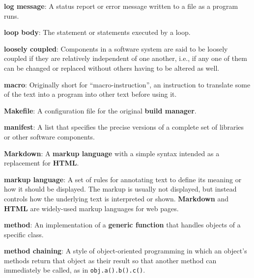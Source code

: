 \documentclass[krantzl]{krantz}
\newcommand{\glosskey}[1]{\textbf{#1}}
\begin{document}
\noindent \textbf{{\newline}\glosskey{log message}}: 
A status report or error message written to a file as a program runs.


\noindent \textbf{{\newline}\glosskey{loop body}}: 
The statement or statements executed by a loop.


\noindent \textbf{{\newline}\glosskey{loosely coupled}}: 
Components in a software system are said to be loosely coupled if they are relatively independent of one another, i.e., if any one of them can be changed or replaced without others having to be altered as well.


\noindent \textbf{{\newline}\glosskey{macro}}: 
Originally short for “macro-instruction”, an instruction to translate some of the text into a program into other text before using it.


\noindent \textbf{{\newline}\glosskey{Makefile}}: 
A configuration file for the original \glosskey{build manager}.


\noindent \textbf{{\newline}\glosskey{manifest}}: 
A list that specifies the precise versions of a complete set of libraries or other software components.


\noindent \textbf{{\newline}\glosskey{Markdown}}: 
A \glosskey{markup language} with a simple syntax intended as a replacement for \glosskey{HTML}.


\noindent \textbf{{\newline}\glosskey{markup language}}: 
A set of rules for annotating text to define its meaning or how it should be displayed. The markup is usually not displayed, but instead controls how the underlying text is interpreted or shown. \glosskey{Markdown} and \glosskey{HTML} are widely-used markup languages for web pages.


\noindent \textbf{{\newline}\glosskey{method}}: 
An implementation of a \glosskey{generic function} that handles objects of a specific class.


\noindent \textbf{{\newline}\glosskey{method chaining}}: 
A style of object-oriented programming in which an object’s methods return that object as their result so that another method can immediately be called, as in \texttt{obj.a().b().c()}.
\end{document}
